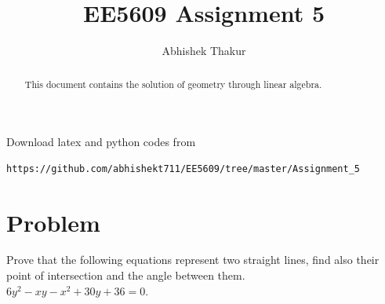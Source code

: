 \documentclass[journal,12pt,twocolumn]{IEEEtran}
\begin{document}
     \def\rightbox#1{\makebox[0in][r]{#1}}
     \def\centbox#1{\makebox[0in]{#1}}
     \def\topbox#1{\raisebox{-\baselineskip}[0in][0in]{#1}}
     \def\midbox#1{\raisebox{-0.5\baselineskip}[0in][0in]{#1}}
\vspace{3cm}
\title{EE5609 Assignment 5}
\author{Abhishek Thakur}
\maketitle
\newpage
\bigskip
\renewcommand{\thefigure}{\theenumi}
\renewcommand{\thetable}{\theenumi}
\begin{abstract}
This document contains the solution of geometry through linear algebra.
\end{abstract}
Download latex and python codes from 
\begin{lstlisting}
https://github.com/abhishekt711/EE5609/tree/master/Assignment_5
\end{lstlisting}
%
\section{Problem}
Prove that the following equations represent two straight lines, find also their point of intersection and the angle between them.\\
$6y^2-xy-x^2+30y+36=0$.
\end{document}
